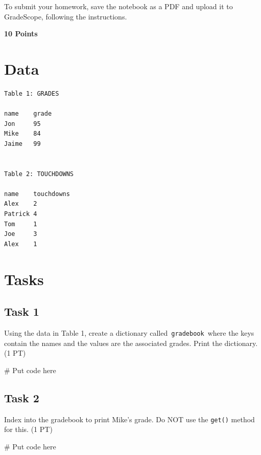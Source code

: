 \documentclass[
  letterpaper,
  DIV=11,
  numbers=noendperiod]{scrreprt}
\newenvironment{Shaded}{\begin{snugshade}}{\end{snugshade}}
\newcommand{\CommentTok}[1]{\textcolor[rgb]{0.37,0.37,0.37}{#1}}
\begin{document}
To submit your homework, save the notebook as a PDF and upload it to
GradeScope, following the instructions.

\textbf{10 Points}

\hypertarget{data}{%
\chapter{Data}\label{data}}

\begin{verbatim}
Table 1: GRADES

name    grade
Jon     95
Mike    84
Jaime   99


Table 2: TOUCHDOWNS

name    touchdowns
Alex    2
Patrick 4
Tom     1
Joe     3
Alex    1
\end{verbatim}

\hypertarget{tasks}{%
\chapter{Tasks}\label{tasks}}

\hypertarget{task-1}{%
\section{Task 1}\label{task-1}}

Using the data in Table 1, create a dictionary
called~\texttt{gradebook}~where the keys contain the names and the
values are the associated grades. Print the dictionary. (1 PT)

\begin{Shaded}
\begin{Highlighting}[]
\CommentTok{\# Put code here}
\end{Highlighting}
\end{Shaded}

\hypertarget{task-2}{%
\section{Task 2}\label{task-2}}

Index into the gradebook to print Mike's grade. Do NOT use the
\texttt{get()} method for this. (1 PT)

\begin{Shaded}
\begin{Highlighting}[]
\CommentTok{\# Put code here}
\end{Highlighting}
\end{Shaded}
\end{document}
